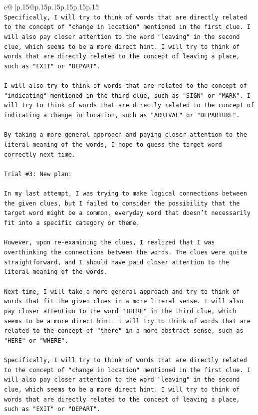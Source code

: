 \documentclass{article}
\begin{document}
{\begin{supertabular}{c@{$\;$}|p{.15\linewidth}@{}p{.15\linewidth}p{.15\linewidth}p{.15\linewidth}p{.15\linewidth}p{.15\linewidth}}
{{{\\ 
\texttt{Specifically, I will try to think of words that are directly related to the concept of "change in location" mentioned in the first clue. I will also pay closer attention to the word "leaving" in the second clue, which seems to be a more direct hint. I will try to think of words that are directly related to the concept of leaving a place, such as "EXIT" or "DEPART".} \\
\\ 
\texttt{I will also try to think of words that are related to the concept of "indicating" mentioned in the third clue, such as "SIGN" or "MARK". I will try to think of words that are directly related to the concept of indicating a change in location, such as "ARRIVAL" or "DEPARTURE".} \\
\\ 
\texttt{By taking a more general approach and paying closer attention to the literal meaning of the words, I hope to guess the target word correctly next time.} \\
\\ 
\texttt{Trial \#3: New plan: } \\
\\ 
\texttt{In my last attempt, I was trying to make logical connections between the given clues, but I failed to consider the possibility that the target word might be a common, everyday word that doesn't necessarily fit into a specific category or theme. } \\
\\ 
\texttt{However, upon re{-}examining the clues, I realized that I was overthinking the connections between the words. The clues were quite straightforward, and I should have paid closer attention to the literal meaning of the words.} \\
\\ 
\texttt{Next time, I will take a more general approach and try to think of words that fit the given clues in a more literal sense. I will also pay closer attention to the word "THERE" in the third clue, which seems to be a more direct hint. I will try to think of words that are related to the concept of "there" in a more abstract sense, such as "HERE" or "WHERE".} \\
\\ 
\texttt{Specifically, I will try to think of words that are directly related to the concept of "change in location" mentioned in the first clue. I will also pay closer attention to the word "leaving" in the second clue, which seems to be a more direct hint. I will try to think of words that are directly related to the concept of leaving a place, such as "EXIT" or "DEPART".} \\
}}}
\end{supertabular}}
\end{document}
